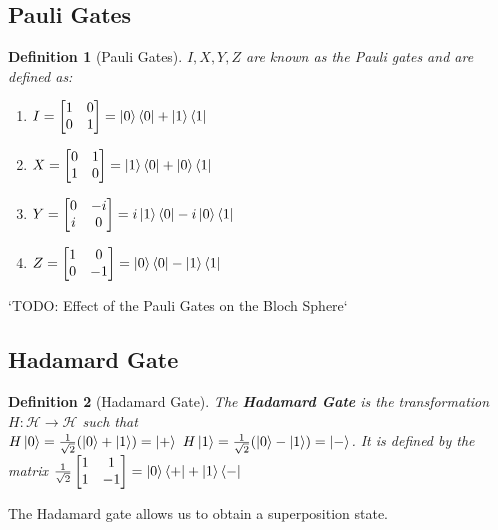 \documentclass[12pt,twoside,fleqn]{report}
\theoremstyle{thmstyle}
\newtheorem{defn}{Definition}[chapter]
\begin{document}
\subsection{Pauli Gates}
\begin{defn}[Pauli Gates]
    $I, X, Y, Z$ are known as the Pauli gates and are defined as:
    \begin{enumerate}
        \item $I = \begin{bmatrix} 1 & 0 \\ 0 & 1 \end{bmatrix} = \ket{0}\bra{0} + \ket{1}\bra{1}$
        \item $X = \begin{bmatrix} 0 & 1 \\ 1 & 0 \end{bmatrix} = \ket{1}\bra{0} + \ket{0}\bra{1}$
        \item $Y = \begin{bmatrix} 0 & -i \\ i & 0 \end{bmatrix} = i \ket{1}\bra{0} - i \ket{0}\bra{1}$
        \item $Z = \begin{bmatrix} 1 & 0 \\ 0 & -1 \end{bmatrix} = \ket{0}\bra{0} - \ket{1}\bra{1}$
    \end{enumerate}
\end{defn}

`TODO: Effect of the Pauli Gates on the Bloch Sphere`

\subsection{Hadamard Gate}
\begin{defn}[Hadamard Gate]
    The \textbf{Hadamard Gate} is the transformation $H: \mathcal{H} \to \mathcal{H}$ such that \\
    $H \ket{0} = \frac{1}{\sqrt{2}} (\ket{0} + \ket{1}) = \ket{+}$
    $H \ket{1} = \frac{1}{\sqrt{2}} (\ket{0} - \ket{1}) = \ket{-}$.  It is defined by the matrix
    $\frac{1}{\sqrt{2}} \begin{bmatrix} 1 & 1 \\ 1 & -1 \end{bmatrix} = \ket{0}\bra{+} + \ket{1}\bra{-}$
\end{defn}
The Hadamard gate allows us to obtain a superposition state.
\end{document}
